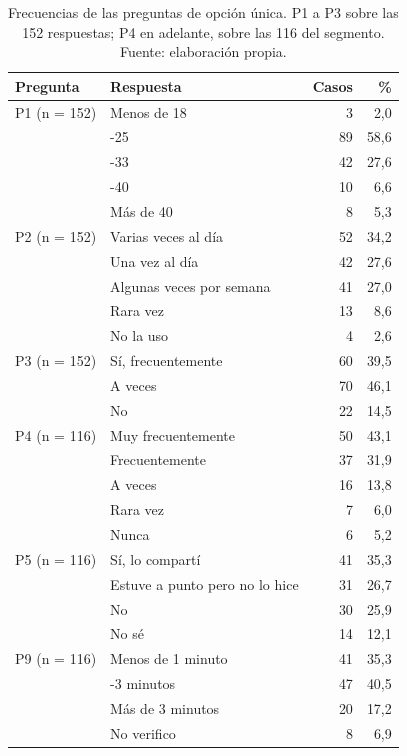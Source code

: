 
\begin{table}[t]
  \centering\small
  \caption{Frecuencias de las preguntas de opción única. P1 a P3 sobre las 152 respuestas; P4 en adelante, sobre las 116 del segmento. Fuente: elaboración propia.}
  \label{tab:enc-unica}
  \begin{tabular}{l >{\raggedright\arraybackslash}p{8.4cm} rr}
    \hline
    \textbf{Pregunta} & \textbf{Respuesta} & \textbf{Casos} & \textbf{\%} \\
    \hline
    P1 (n = 152) & Menos de 18 & 3 & 2,0 \\
     & 18-25 & 89 & 58,6 \\
     & 26-33 & 42 & 27,6 \\
     & 34-40 & 10 & 6,6 \\
     & Más de 40 & 8 & 5,3 \\
    \hline
    P2 (n = 152) & Varias veces al día & 52 & 34,2 \\
     & Una vez al día & 42 & 27,6 \\
     & Algunas veces por semana & 41 & 27,0 \\
     & Rara vez & 13 & 8,6 \\
     & No la uso & 4 & 2,6 \\
    \hline
    P3 (n = 152) & Sí, frecuentemente & 60 & 39,5 \\
     & A veces & 70 & 46,1 \\
     & No & 22 & 14,5 \\
    \hline
    P4 (n = 116) & Muy frecuentemente & 50 & 43,1 \\
     & Frecuentemente & 37 & 31,9 \\
     & A veces & 16 & 13,8 \\
     & Rara vez & 7 & 6,0 \\
     & Nunca & 6 & 5,2 \\
    \hline
    P5 (n = 116) & Sí, lo compartí & 41 & 35,3 \\
     & Estuve a punto pero no lo hice & 31 & 26,7 \\
     & No & 30 & 25,9 \\
     & No sé & 14 & 12,1 \\
    \hline
    P9 (n = 116) & Menos de 1 minuto & 41 & 35,3 \\
     & 1-3 minutos & 47 & 40,5 \\
     & Más de 3 minutos & 20 & 17,2 \\
     & No verifico & 8 & 6,9 \\
    \hline
  \end{tabular}
\end{table}

